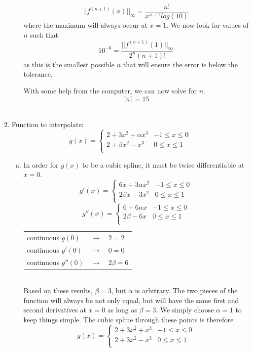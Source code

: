 \documentclass[11pt]{article}
\begin{document}
\begin{enumerate}
\begin{enumerate}[(a)]
				$$||f^{(n+1)}(x)||_{\infty} = \frac{n!}{x^{n+1}log(10)}$$
				where the maximum will always occur at $x=1$. We now look for values of $n$ such that
				$$10^{-6} = \frac{||f^{(n+1)}(1)||_{\infty}}{2^n(n+1)!}$$
				as this is the smallest possible $n$ that will ensure the error is below the tolerance.

				With some help from the computer, we can now solve for $n$.
				$$\lceil n \rceil = 15$$ \\

		\end{enumerate}

	\item Function to interpolate:
		\[
			g(x)=
			\begin{cases}
				2+3x^2+\alpha x^3 & -1 \leq x \leq 0 \\
				2 + \beta x^2 - x^3 & 0 \leq x \leq 1 \\
			\end{cases}
		\]

		\begin{enumerate}[(a)]

			\item In order for $g(x)$ to be a cubic spline, it must be twice differentiable at $x=0$.
			\[
				g'(x)=
				\begin{cases}
					6x + 3\alpha x^2 & -1 \leq x \leq 0 \\
					2\beta x - 3x^2 & 0 \leq x \leq 1 \\
				\end{cases}
			\]
			\[
				g''(x)=
				\begin{cases}
					6 + 6\alpha x & -1 \leq x \leq 0 \\
					2\beta - 6x & 0 \leq x \leq 1 \\
				\end{cases}
			\]

			\begin{tabular}{lll}
				continuous $g(0)$ & $\to$ & $2 = 2$ \\
				continuous $g'(0)$ & $\to$ & $0 = 0$ \\
				continuous $g''(0)$ & $\to$ & $2\beta = 6$ \\
			\end{tabular} \\

			Based on these results, $\beta = 3$, but $\alpha$ is arbitrary. The two pieces of the function will always be
			not only equal, but will have the same first and second derivatives at $x=0$ as long as $\beta = 3$. We simply choose
			$\alpha = 1$ to keep things simple. The cubic spline through these points is therefore
			\[
				g(x)=
				\begin{cases}
					2+3x^2+x^3 & -1 \leq x \leq 0 \\
					2 + 3x^2 - x^3 & 0 \leq x \leq 1 \\
				\end{cases}
			\] \\


\end{enumerate}
\end{enumerate}
\end{document}
